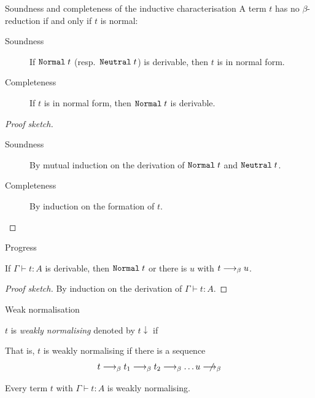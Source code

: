 \begin{frame}{Soundness and completeness of the inductive characterisation}
  A term $t$ has no $\beta$-reduction if and only if $t$ is normal:
  \begin{lemma}
    \begin{description}
      \item[Soundness] If $\normal\;t$ (resp.\ $\neutral\;t$) is derivable, then $t$ is in normal form.
      \item[Completeness]
        If $t$ is in normal form, then $\normal\;t$ is derivable.
    \end{description}
  \end{lemma}
  \begin{proof}[Proof sketch]
    \begin{description}
      \item[Soundness] By mutual induction on the derivation of
    $\normal\;t$ and $\neutral\;t$.
      \item[Completeness] By induction on the formation of $t$.
    \end{description}
  \end{proof}

  
\end{frame}

\begin{frame}{Progress}
  \begin{theorem}
    If $\Gamma \vdash t : A$ is derivable, then $\normal\;t$ or there is $u$ with $t \onereduce u$.
  \end{theorem}
  \begin{proof}[Proof sketch]
    By induction on the derivation of $\Gamma \vdash t : A$. 
  \end{proof}
\end{frame}


\begin{frame}{Weak normalisation}
  \begin{definition}
    $t$ is \emph{weakly normalising} denoted by $t\downarrow$ if 
    \begin{multicols}{2}
      \begin{prooftree}
      \end{prooftree}
      \columnbreak
      \begin{prooftree}
      \end{prooftree}
    \end{multicols}
  \end{definition}
  That is, $t$ is weakly normalising if there is a sequence
  \[
    t \onereduce t_1 \onereduce t_2 \onereduce \dots u \notonereduce 
  \]
  \begin{theorem}
    Every term $t$ with $\Gamma \vdash t : A$ is weakly normalising.
  \end{theorem}
\end{frame}

